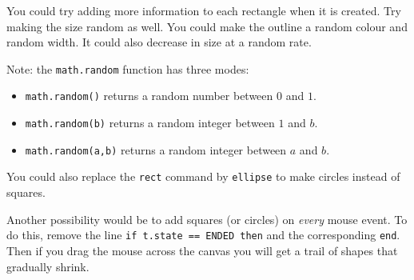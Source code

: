 \documentclass[
  xhtml,%
  use filename%
]{internet}
\begin{document}
You could try adding more information to each rectangle when it is created.
Try making the size random as well.
You could make the outline a random colour and random width.
It could also decrease in size at a random rate.

Note: the \verb+math.random+ function has three modes:

\begin{itemize}
\item \verb+math.random()+ returns a random number between \(0\) and \(1\).
\item \verb+math.random(b)+ returns a random integer between \(1\) and \(b\).
\item \verb+math.random(a,b)+ returns a random integer between \(a\) and \(b\).
\end{itemize}

You could also replace the \verb+rect+ command by \verb+ellipse+ to make circles instead of squares.

Another possibility would be to add squares (or circles) on \emph{every} mouse event.
To do this, remove the line \verb+if t.state == ENDED then+ and the corresponding \verb+end+.
Then if you drag the mouse across the canvas you will get a trail of shapes that gradually shrink.
\end{document}
